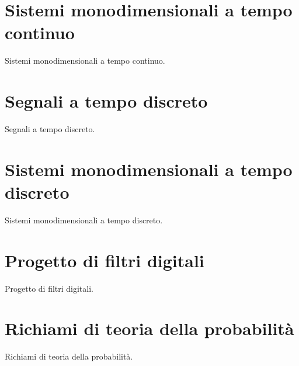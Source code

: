 \documentclass[12pt,oneside,openany]{memoir}
\numberwithin{equation}{subsection}
\begin{document}

\newpage
\section{Sistemi monodimensionali a tempo continuo}
Sistemi monodimensionali a tempo continuo.


\section{Segnali a tempo discreto}
Segnali a tempo discreto.


\section{Sistemi monodimensionali a tempo discreto}
Sistemi monodimensionali a tempo discreto.


\section{Progetto di filtri digitali}
Progetto di filtri digitali.


\section{Richiami di teoria della probabilit\`a}
Richiami di teoria della probabilit\`a.
\end{document}
